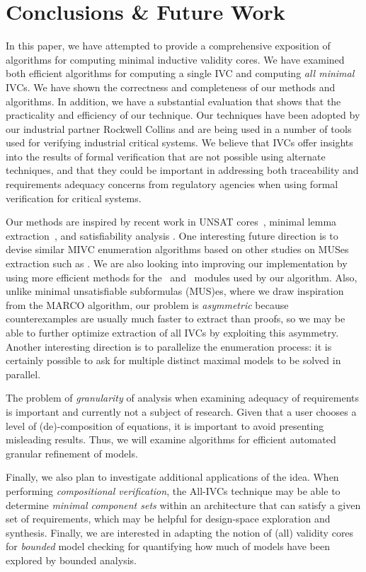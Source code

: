 \section{Conclusions \& Future Work}
\label{sec:conc}
In this paper, we have attempted to provide a comprehensive exposition of algorithms for computing minimal inductive validity cores.  We have examined both efficient algorithms for computing a single IVC and computing {\em all minimal} IVCs. We have shown
the correctness and completeness of our methods and algorithms.  In addition, we have a substantial evaluation that shows that the practicality and efficiency of our technique.
%
Our techniques have been adopted by our industrial partner Rockwell Collins and are being used in a number of tools used for verifying industrial critical systems.  We believe that IVCs offer insights into the results of formal verification that are not possible using alternate techniques, and that they could be important in addressing both traceability and requirements adequacy concerns from regulatory agencies when using formal verification for critical systems.

Our methods are inspired by recent work in UNSAT cores~\cite{zhang2003extracting}, minimal lemma extraction~\cite{piskac2016}, and satisfiability analysis \cite{marco2016fast}. One interesting future direction is to devise similar MIVC enumeration algorithms based on other studies on MUSes extraction such as \cite{nadel2014accelerated}.  We are also looking into improving our implementation by using more  efficient methods for the \isadeq ~and \getivc ~modules used by our algorithm.  Also, unlike minimal unsatisfiable subformulas (MUS)es, where we draw inspiration from the MARCO algorithm, our problem is {\em asymmetric} because counterexamples are usually much faster to extract than proofs, so we may be able to further optimize extraction of all IVCs by exploiting this asymmetry.  Another interesting direction is to parallelize the enumeration process: it is certainly possible to ask for multiple distinct maximal models to be solved in parallel.

The problem of {\em granularity} of analysis when examining adequacy of requirements is important and currently not a subject of research.  Given that a user chooses a level of (de)-composition of equations, it is important to avoid presenting misleading results.  Thus, we will examine algorithms for efficient automated granular refinement of models.  

Finally, we also plan to investigate additional applications of the idea.  When performing {\em compositional verification}, the All-IVCs technique may be able to determine {\em minimal component sets} within an architecture that can satisfy a given set of requirements, which may be helpful for design-space exploration and synthesis. Finally, we are interested in adapting the notion of (all) validity cores for \emph{bounded} model checking for quantifying how much of models have been explored by bounded analysis. 